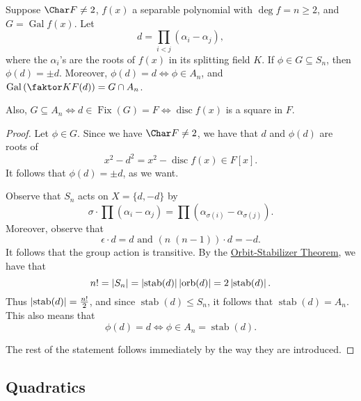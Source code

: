 \documentclass[notoc,notitlepage,nobib]{tufte-book}
\DeclareMathOperator{\disc}{disc}
\DeclareMathOperator{\Gal}{Gal}
\DeclareMathOperator{\Fix}{Fix}
\DeclareMathOperator{\stab}{stab}
\DeclareMathOperator{\orb}{orb}
\begin{document}
\begin{propo}\label{propo:galois_group_of_finite_extensions}
  Suppose $\Char F \neq 2$, $f(x)$ a separable polynomial with $\deg f = n \geq
  2$, and $G = \Gal f(x)$. Let 
  \begin{equation*}
    d = \prod_{i < j} (\alpha_i - \alpha_j),
  \end{equation*}
  where the $\alpha_i$'s are the roots of $f(x)$ in its splitting field $K$. If
  $\phi \in G \subseteq S_n$, then $\phi(d) = \pm d$. Moreover, $\phi(d) = d
  \iff \phi \in A_n$, and $\Gal \left( \quotient{K}{F(d)} \right) = G \cap A_n$.

  Also, $G \subseteq A_n \iff d \in \Fix(G) = F \iff \disc f(x)$ is a square in
  $F$.
\end{propo}

\begin{proof}
  Let $\phi \in G$. Since we have $\Char F \neq 2$, we have that $d$ and
  $\phi(d)$ are roots of
  \begin{equation*}
    x^2 - d^2 = x^2 - \disc f(x) \in F[x].
  \end{equation*}
  It follows that $\phi(d) = \pm d$, as we want.

  Observe that $S_n$ acts on $X = \{d, -d\}$ by
  \begin{equation*}
    \sigma \cdot \prod (\alpha_i - \alpha_j) = \prod (\alpha_{\sigma(i)} -
    \alpha_{\sigma(j)}).
  \end{equation*}
  Moreover, observe that
  \begin{equation*}
    \epsilon \cdot d = d \text{ and } (n \; (n - 1)) \cdot d = -d.
  \end{equation*}
  It follows that the group action is transitive. By the
  \hyperref[thm:orbit_stabilizer_theorem]{Orbit-Stabilizer Theorem}, we have
  that
  \begin{equation*}
    n! = \abs{S_n} = \abs{\stab(d)} \abs{\orb(d)} = 2 \abs{\stab(d)}.
  \end{equation*}
  Thus $\abs{\stab(d)} = \frac{n!}{2}$, and since $\stab(d) \leq S_n$, it
  follows that $\stab(d) = A_n$. This also means that
  \begin{equation*}
    \phi(d) = d \iff \phi \in A_n = \stab(d).
  \end{equation*}

  The rest of the statement follows immediately by the way they are introduced.
\end{proof}

\subsection{Quadratics}%
\label{sub:quadratics}
\end{document}

